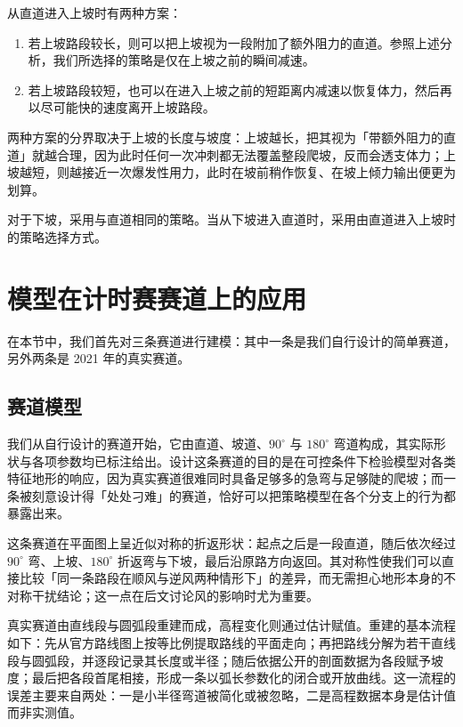 \documentclass[11pt,a4paper]{ctexart}
\begin{document}
从直道进入上坡时有两种方案：

\begin{enumerate}
\item 若上坡路段较长，则可以把上坡视为一段附加了额外阻力的直道。参照上述分析，我们所选择的策略是仅在上坡之前的瞬间减速。
\item 若上坡路段较短，也可以在进入上坡之前的短距离内减速以恢复体力，然后再以尽可能快的速度离开上坡路段。
\end{enumerate}

两种方案的分界取决于上坡的长度与坡度：上坡越长，把其视为「带额外阻力的直道」就越合理，因为此时任何一次冲刺都无法覆盖整段爬坡，反而会透支体力；上坡越短，则越接近一次爆发性用力，此时在坡前稍作恢复、在坡上倾力输出便更为划算。

对于下坡，采用与直道相同的策略。当从下坡进入直道时，采用由直道进入上坡时的策略选择方式。

\section{模型在计时赛赛道上的应用}

在本节中，我们首先对三条赛道进行建模：其中一条是我们自行设计的简单赛道，另外两条是 2021 年的真实赛道。

\subsection{赛道模型}

我们从自行设计的赛道开始，它由直道、坡道、$90^\circ$ 与 $180^\circ$ 弯道构成，其实际形状与各项参数均已标注给出。设计这条赛道的目的是在可控条件下检验模型对各类特征地形的响应，因为真实赛道很难同时具备足够多的急弯与足够陡的爬坡；而一条被刻意设计得「处处刁难」的赛道，恰好可以把策略模型在各个分支上的行为都暴露出来。

这条赛道在平面图上呈近似对称的折返形状：起点之后是一段直道，随后依次经过 $90^\circ$ 弯、上坡、$180^\circ$ 折返弯与下坡，最后沿原路方向返回。其对称性使我们可以直接比较「同一条路段在顺风与逆风两种情形下」的差异，而无需担心地形本身的不对称干扰结论；这一点在后文讨论风的影响时尤为重要。

真实赛道由直线段与圆弧段重建而成，高程变化则通过估计赋值。重建的基本流程如下：先从官方路线图上按等比例提取路线的平面走向；再把路线分解为若干直线段与圆弧段，并逐段记录其长度或半径；随后依据公开的剖面数据为各段赋予坡度；最后把各段首尾相接，形成一条以弧长参数化的闭合或开放曲线。这一流程的误差主要来自两处：一是小半径弯道被简化或被忽略，二是高程数据本身是估计值而非实测值。
\end{document}
